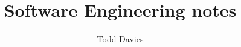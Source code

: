 \newcommand{\coursename}{Software Engineering}
\newcommand{\coursecode}{COMP23420}
\newcommand{\courseinfo}{}
\newcommand{\Author}{Todd Davies} 
\newcommand{\Title}{Software Engineering notes}
\author{\Author}
\title{\Title}
